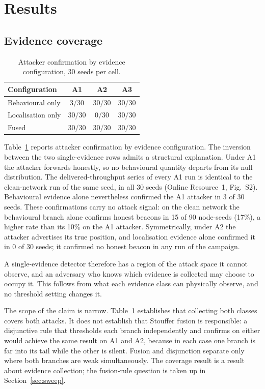\documentclass[pdflatex,sn-mathphys-num]{sn-jnl}%
\theoremstyle{thmstyleone}%
\theoremstyle{thmstyletwo}%
\theoremstyle{thmstylethree}%
\begin{document}
\section{Results}
\label{sec:results}

\subsection{Evidence coverage}
\label{sec:coverage}

\begin{table}[!t]
\caption{Attacker confirmation by evidence configuration, 30 seeds per cell.}
\label{tab:coverage}
\centering
\footnotesize
\begin{tabular}{@{}lccc@{}}
\toprule
Configuration & A1 & A2 & A3 \\
\midrule
Behavioural only & 3/30 & 30/30 & 30/30 \\
Localisation only & 30/30 & 0/30 & 30/30 \\
Fused & 30/30 & 30/30 & 30/30 \\
\bottomrule
\end{tabular}
\end{table}

Table~\ref{tab:coverage} reports attacker
confirmation by evidence configuration. The inversion between the two
single-evidence rows admits a structural explanation. Under A1 the attacker
forwards honestly, so no behavioural quantity departs from its null
distribution. The delivered-throughput series of every A1 run is identical to
the clean-network run of the same seed, in all 30 seeds (Online Resource~1, Fig.~S2).
Behavioural evidence alone nevertheless confirmed the A1 attacker in 3 of 30
seeds. These confirmations carry no attack signal: on the clean network the
behavioural branch alone confirms honest beacons in 15 of 90 node-seeds (17\%),
a higher rate than its 10\% on the A1 attacker. Symmetrically, under A2 the
attacker advertises its true position, and localisation evidence alone
confirmed it in 0 of 30 seeds; it confirmed no honest beacon in any run of the
campaign.

A single-evidence detector therefore has a region of the attack space it
cannot observe, and an adversary who knows which evidence is collected may
choose to occupy it. This follows from what each evidence class can physically
observe, and no threshold setting changes it.

The scope of the claim is narrow. Table~\ref{tab:coverage} establishes that
collecting both classes covers both attacks. It does not establish that
Stouffer fusion is responsible: a disjunctive rule that thresholds each branch
independently and confirms on either would achieve the same result on A1 and
A2, because in each case one branch is far into its tail while the other is
silent. Fusion and disjunction separate only where both branches are weak
simultaneously. The coverage result is a result about evidence collection; the
fusion-rule question is taken up in Section~\ref{sec:sweep}.
\end{document}
